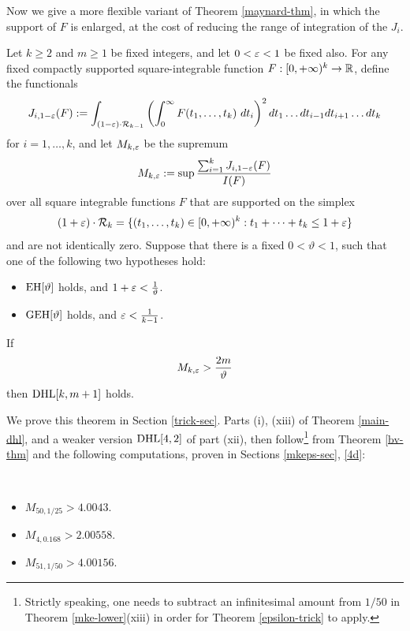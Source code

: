 Now we give a more flexible variant of Theorem \ref{maynard-thm}, in which the support of $F$ is enlarged, at the cost of reducing the range of integration of the $J_i$.

\begin{theorem}\label{epsilon-trick}  Let $k \geq 2$ and $m \geq 1$ be fixed integers, and let $0 < \varepsilon < 1$ be fixed also. For any fixed compactly supported square-integrable function $F: [0,+\infty)^k \to \mathbb{R}$, define the functionals
$$ J_{i,1-\varepsilon}(F) := \int_{(1-\varepsilon) \cdot {\mathcal R}_{k-1}} \left(\int_0^\infty F(t_1,\dots,t_k)\ dt_i\right)^2 dt_1 \dots dt_{i-1} dt_{i+1} \dots dt_k$$
for $i=1,\dots,k$, and let $M_{k,\varepsilon}$ be the supremum
$$ M_{k,\varepsilon} := \sup \frac{\sum_{i=1}^k J_{i,1-\varepsilon}(F)}{I(F)}$$
over all square integrable functions $F$ that are supported on the simplex
$$ (1+\varepsilon) \cdot {\mathcal R}_k = \{ (t_1,\dots,t_k) \in [0,+\infty)^k: t_1+\dots+t_k \leq 1+\varepsilon \}$$
and are not identically zero.  Suppose that there is a fixed $0 < \vartheta < 1$, such that one of the following two hypotheses hold:
\begin{itemize}
\item[(i)]  $\operatorname*{EH}[\vartheta]$ holds, and $1+\varepsilon < \frac{1}{\vartheta}$.
\item[(ii)] $\operatorname*{GEH}[\vartheta]$ holds, and $\varepsilon < \frac{1}{k-1}$.
\end{itemize}
If
$$ M_{k,\varepsilon} > \frac{2m}{\vartheta}$$
then $\operatorname*{DHL}[k,m+1]$ holds.
\end{theorem}

We prove this theorem in Section \ref{trick-sec}.  Parts (i), (xiii) of Theorem \ref{main-dhl}, and a weaker version $\operatorname*{DHL}[4,2]$ of part (xii), then follow\footnote{Strictly speaking, one needs to subtract an infinitesimal amount from $1/50$ in Theorem \ref{mke-lower}(xiii) in order for Theorem \ref{epsilon-trick} to apply.} from Theorem \ref{bv-thm} and the following computations, proven in Sections \ref{mkeps-sec}, \ref{4d}:

\begin{theorem}\label{mke-lower}\
\begin{itemize}
\item[(i)] $M_{50,1/25} > 4.0043$.
\item[(xii')] $M_{4,0.168} > 2.00558$.
\item[(xiii)] $M_{51,1/50} > 4.00156$.
\end{itemize}
\end{theorem}

